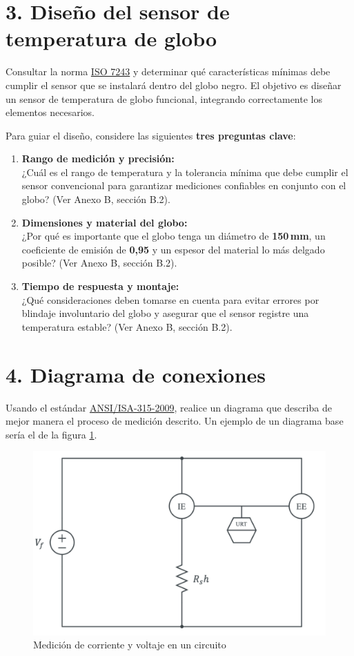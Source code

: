 \documentclass[12pt]{article}
\begin{document}
\section*{3. Diseño del sensor de temperatura de globo}
Consultar la norma \href{https://es.slideshare.net/slideshow/international-standard-iso-7243/251054896}{ISO 7243} y determinar qué características mínimas debe cumplir el sensor que se instalará dentro del globo negro.  
El objetivo es diseñar un sensor de temperatura de globo funcional, integrando correctamente los elementos necesarios.

Para guiar el diseño, considere las siguientes \textbf{tres preguntas clave}:

\begin{enumerate}
    \item \textbf{Rango de medición y precisión:} \\
    ¿Cuál es el rango de temperatura y la tolerancia mínima que debe cumplir el sensor convencional para garantizar mediciones confiables en conjunto con el globo? (Ver Anexo B, sección B.2).
    \item \textbf{Dimensiones y material del globo:} \\
    ¿Por qué es importante que el globo tenga un diámetro de \textbf{150\,mm}, un coeficiente de emisión de \textbf{0,95} y un espesor del material lo más delgado posible? (Ver Anexo B, sección B.2).
    \item \textbf{Tiempo de respuesta y montaje:} \\
    ¿Qué consideraciones deben tomarse en cuenta para evitar errores por blindaje involuntario del globo y asegurar que el sensor registre una temperatura estable? (Ver Anexo B, sección B.2).
\end{enumerate}

\section*{4. Diagrama de conexiones}
Usando el estándar \href{https://www.scribd.com/document/621156343/ANSI-ISA-5-1-2009-Traducido}{ANSI/ISA-315-2009}, realice un diagrama que describa de mejor manera el proceso de medición descrito. Un ejemplo de un diagrama base sería el de la figura \ref{ejemplo 2}.
\begin{figure}[h]
    \centering
    \includegraphics[width=0.4\linewidth]{fig/diagrama2.jpg}
    \caption{Medición de corriente y voltaje en un circuito}
    \label{ejemplo 2}
\end{figure}
\end{document}
